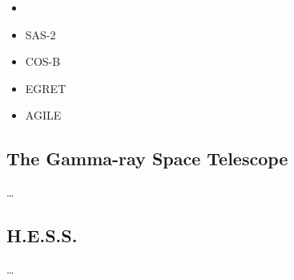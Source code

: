 \begin{itemize}
\item 
  

  \item SAS-2
  \item COS-B
  \item EGRET

  \item AGILE
\end{itemize}

\subsection{The \fermi Gamma-ray Space Telescope}

\ldots


\subsection{H.E.S.S.}

\ldots

